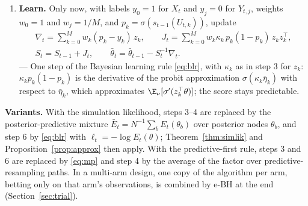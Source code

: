 \begin{enumerate}
        prequential likelihood ratio \eqref{eq:prequential-wealth} of the
        forecasts against the simulator, and it grows at about
        $\frac{M}{M+1}\{\KL(Q\|P) - \KL(Q\|\tilde T)\}$ per step
        (Theorem~\ref{thm:growth}).
  \item \textbf{Learn.} Only now, with labels $y_0 = 1$ for $X_t$ and $y_j = 0$
        for $Y_{t,j}$, weights $w_0 = 1$ and $w_j = 1/M$, and
        $p_k = \sigma(s_{t-1}(U_{t,k}))$, update
        \[
        \begin{gathered}
        \nabla_t = \sum_{k=0}^{M} w_k (p_k - y_k)\, z_k, \qquad
        J_t = \sum_{k=0}^{M} w_k \kappa_k\, p_k (1 - p_k)\, z_k z_k^\top, \\
        S_t = S_{t-1} + J_t, \qquad \bar\theta_t = \bar\theta_{t-1} - S_t^{-1} \nabla_t .
        \end{gathered}
        \]
        --- One step of the Bayesian learning rule \eqref{eq:blr}, with $\kappa_k$
        as in step 3 for $z_k$: $\kappa_k p_k(1-p_k)$ is the derivative of the
        probit approximation $\sigma(\kappa_k\bar\eta_k)$ with respect to
        $\bar\eta_k$, which approximates $\E_\nu[\sigma'(z_k^\top\theta)]$; the score
        stays predictable.
\end{enumerate}
\textbf{Variants.} With the simulation likelihood, steps 3--4 are replaced by
the posterior-predictive mixture $\bar E_t = N^{-1}\sum_b E_t(\theta_b)$ over
posterior nodes $\theta_b$, and step 6 by \eqref{eq:blr} with
$\ell_t = -\log E_t(\theta)$; Theorem~\ref{thm:simlik} and
Proposition~\ref{prop:approx} then apply. With the predictive-first rule,
steps 3 and 6 are replaced by \eqref{eq:mp} and step 4 by the average of the
factor over predictive-resampling paths. In a multi-arm design, one copy of the
algorithm per arm, betting only on that arm's observations, is combined by e-BH
at the end (Section~\ref{sec:trial}).



